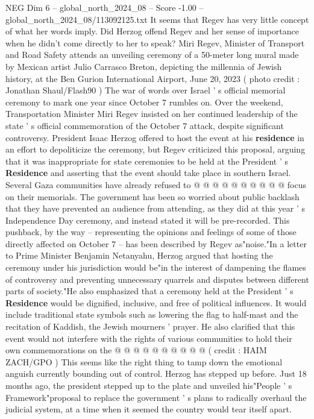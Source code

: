 \begin{textsample}{NEG Dim 6 – global\_north\_2024\_08 – Score -1.00 – global\_north\_2024\_08/113092125.txt}  \label{ex:f6_neg_163}
It seems that Regev has very little concept of what her words imply.
Did Herzog offend Regev and her sense of importance when he didn't come directly to her to speak?
Miri Regev, Minister of Transport and Road Safety attends an unveiling ceremony of a 50-meter long mural made by Mexican artist Julio Carrasco Breton, depicting the millennia of Jewish history, at the Ben Gurion International Airport, June 20, 2023 ( photo credit : Jonathan Shaul/Flash90 ) The war of words over Israel ' s official memorial ceremony to mark one year since October 7 rumbles on.
Over the weekend, Transportation Minister Miri Regev insisted on her continued leadership of the state ' s official commemoration of the October 7 attack, despite significant controversy.
President Isaac Herzog offered to host the event at his \textbf{residence} in an effort to depoliticize the ceremony, but Regev criticized this proposal, arguing that it was inappropriate for state ceremonies to be held at the President ' s \textbf{Residence} and asserting that the event should take place in southern Israel.
Several Gaza communities have already refused to @ @ @ @ @ @ @ @ @ @ focus on their memorials.
The government has been so worried about public backlash that they have prevented an audience from attending, as they did at this year ' s Independence Day ceremony, and instead stated it will be pre-recorded.
This pushback, by the way -- representing the opinions and feelings of some of those directly affected on October 7 -- has been described by Regev as"noise."In a letter to Prime Minister Benjamin Netanyahu, Herzog argued that hosting the ceremony under his jurisdiction would be"in the interest of dampening the flames of controversy and preventing unnecessary quarrels and disputes between different parts of society."He also emphasized that a ceremony held at the President ' s \textbf{Residence} would be dignified, inclusive, and free of political influences.
It would include traditional state symbols such as lowering the flag to half-mast and the recitation of Kaddish, the Jewish mourners ' prayer.
He also clarified that this event would not interfere with the rights of various communities to hold their own commemorations on the @ @ @ @ @ @ @ @ @ @ ( credit : HAIM ZACH/GPO ) This seems like the right thing to tamp down the emotional anguish currently bounding out of control.
Herzog has stepped up before.
Just 18 months ago, the president stepped up to the plate and unveiled his"People ' s Framework"proposal to replace the government ' s plans to radically overhaul the judicial system, at a time when it seemed the country would tear itself apart.

\end{textsample}
